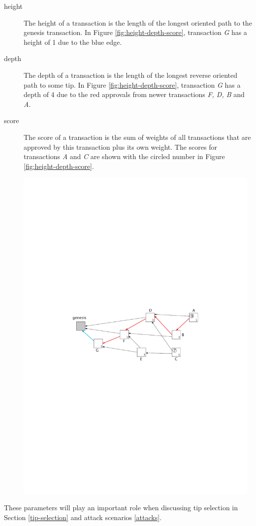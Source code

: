 \begin{description}
\begin{minipage}{\linewidth}
            \label{fig:cumulative-weight}
        \end{minipage}
    \item[height] The height of a transaction is the length of the longest oriented path to the genesis transaction. In Figure \ref{fig:height-depth-score}, transaction \textit{G} has a height of 1 due to the blue edge.
    \item[depth] The depth of a transaction is the length of the longest reverse oriented path to some tip. In Figure \ref{fig:height-depth-score}, transaction \textit{G} has a depth of 4 due to the red approvals from newer transactions \textit{F, D, B} and \textit{A}.
    \item[score] The score of a transaction is the sum of weights of all transactions that are approved by this transaction plus its own weight. The scores for transactions \textit{A} and \textit{C} are shown with the circled number in Figure \ref{fig:height-depth-score}.\par
        \begin{minipage}{\linewidth}
            \centering
            \includegraphics[width=12cm]{images/height-depth-score.pdf}
            \label{fig:height-depth-score}
        \end{minipage}
\end{description}

These parameters will play an important role when discussing tip selection in Section \ref{tip-selection} and attack scenarios \ref{attacks}.